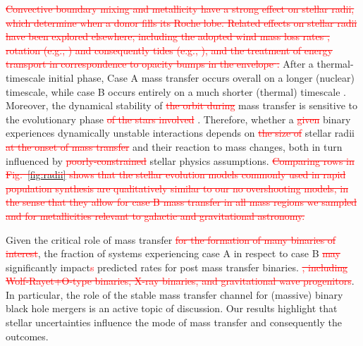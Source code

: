 \documentclass[twocolumn]{aastex63}
\DeclareRobustCommand{\Figref}[1]{Fig.~\ref{#1}}
\newcommand{\cut}[1]{\textcolor{red}{\sout{#1}}}
\begin{document}
\cut{Convective boundary mixing \citep{brott:11, johnston:24} and
  metallicity \citep[e.g.,][]{xin:22} have a strong effect on stellar
  radii, which determine when a donor fills its Roche lobe. Related
  effects on stellar radii have been explored elsewhere, including the
  adopted wind mass loss rates \citep[e.g.,][]{smith:14, renzo:17,
    josiek:24}, rotation (e.g., \citealt{maeder:00}) and consequently
  tides (e.g., \citealt{fabry:22}), and the treatment of energy
  transport in correspondence to opacity bumps in the envelope
  \citep[e.g.,][]{joss:73, agrawal:22, cheng:24}. } After a
thermal-timescale initial phase, Case A mass transfer occurs overall
on a longer (nuclear) timescale, while case B occurs entirely on a
much shorter (thermal) timescale \citep[but see][]{klencki:22}.
Moreover, the dynamical stability of \cut{the orbit during} mass
transfer is sensitive to the evolutionary phase \cut{of the stars
  involved} \citep[e.g.,][]{claeys:14}. Therefore, whether a
\cut{given} binary experiences dynamically unstable interactions
depends on \cut{the size of} stellar radii \cut{at the onset of mass
  transfer} and their reaction to mass changes, both in turn
influenced by \cut{poorly-constrained} stellar physics assumptions.
\cut{Comparing rows in \Figref{fig:radii} shows that the stellar evolution
models commonly used in rapid population synthesis are qualitatively
similar to our no overshooting models, in the sense that they allow
for case B mass transfer in all mass regions we sampled and for
metallicities relevant to galactic and gravitational astronomy.
}

Given the critical role of mass transfer \cut{for the formation of
  many binaries of interest}, the fraction of systems experiencing
case A in respect to case B \cut{may} significantly
impact\textcolor{red}{s} predicted rates for post mass transfer
binaries. \cut{, including Wolf-Rayet+O-type binaries, X-ray binaries, and
gravitational wave progenitors}. In particular, the role of the stable
mass transfer channel \citep[e.g.,][]{marchant:21, vanson:22} for
(massive) binary black hole mergers is an active topic of discussion.
Our results highlight that stellar uncertainties influence the mode of
mass transfer and consequently the outcomes.




\end{document}
